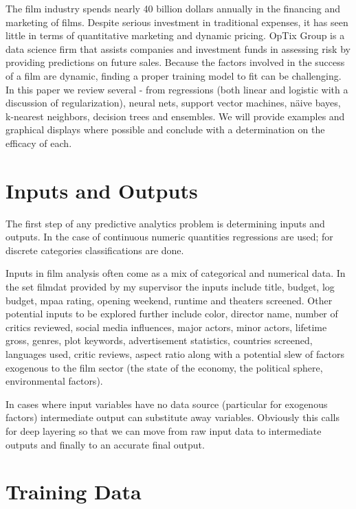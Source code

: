 \documentclass{article}
\begin{document}
\begin{spacing}{1.1}
The film industry spends nearly 40 billion dollars annually in the financing and marketing of films.  Despite serious investment in traditional expenses, it has seen little in terms of quantitative marketing and dynamic pricing.  OpTix Group is a data science firm that assists companies and investment funds in assessing risk by providing predictions on future sales.  Because the factors involved in the success of a film are dynamic, finding a proper training model to fit can be challenging.  In this paper we review several - from regressions (both linear and logistic with a discussion of regularization), neural nets, support vector machines, n{\"a}ive bayes, k-nearest neighbors, decision trees and ensembles.  We will provide examples and graphical displays where possible and conclude with a determination on the efficacy of each.  

\section{Inputs and Outputs}

The first step of any predictive analytics problem is determining inputs and outputs.  In the case of continuous numeric quantities regressions are used; for discrete categories classifications are done.  

\vspace{3mm}

Inputs in film analysis often come as a mix of categorical and numerical data.  In the set filmdat provided by my supervisor the inputs include title, budget, log budget, mpaa rating, opening weekend, runtime and theaters screened.  Other potential inputs to be explored further include color, director name, number of critics reviewed, social media influences, major actors, minor actors, lifetime gross, genres, plot keywords, advertisement statistics, countries screened, languages used, critic reviews, aspect ratio along with a potential slew of factors exogenous to the film sector (the state of the economy, the political sphere, environmental factors).  

\vspace{3mm}

In cases where input variables have no data source (particular for exogenous factors) intermediate output can substitute away variables.  Obviously this calls for deep layering so that we can move from raw input data to intermediate outputs and finally to an accurate final output.  

\section{Training Data}


\end{spacing}
\end{document}
